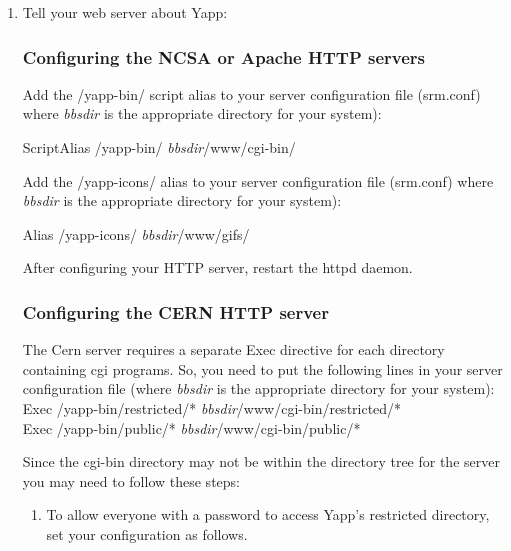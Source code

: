 \documentclass[twoside]{report}
\begin{document}
\begin{enumerate}
   \item 
      Tell your web server about Yapp:

      \subsubsection*{Configuring the NCSA or Apache HTTP servers}
        
         Add the /yapp-bin/ script alias to your server configuration 
         file (srm.conf) where {\em bbsdir} is the appropriate directory for 
         your system): 
         \par

            \qquad \qquad  ScriptAlias /yapp-bin/ {\em bbsdir}/www/cgi-bin/

         \par

         Add the /yapp-icons/ alias to your server configuration file 
         (srm.conf) where {\em bbsdir} is the appropriate directory for 
         your system): 
         \par

            \qquad \qquad  Alias /yapp-icons/ {\em bbsdir}/www/gifs/
         \par

         After configuring your HTTP server, restart the httpd daemon.

      \subsubsection*{Configuring the CERN HTTP server}
         The Cern server requires a separate Exec directive for each directory 
         containing cgi programs. So, you need to put the following lines in 
         your server configuration file (where {\em bbsdir} is the appropriate 
         directory for your system): \\
{   
      \qquad Exec    /yapp-bin/restricted/*  {\em bbsdir}/www/cgi-bin/restricted/*\\
      \qquad Exec    /yapp-bin/public/*      {\em bbsdir}/www/cgi-bin/public/*\\
}

         Since the cgi-bin directory may not be within the directory tree for 
         the server you may need to follow these steps: 
         \begin{enumerate}
            \item To allow everyone with a password to access Yapp's restricted 
                  directory, set your configuration as follows. 


\end{enumerate}
\end{enumerate}
\end{document}
